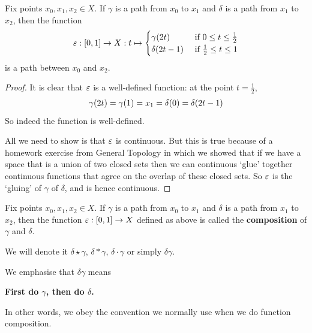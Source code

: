 \begin{proposition}
    Fix points $x_0, x_1, x_2 \in X$. If $\gamma$ is a path from $x_0$ to $x_1$ and $\delta$ is a path from $x_1$ to $x_2$, then the function
    \begin{align*}
        \varepsilon : [0, 1] \to X : t \mapsto
        \begin{cases}
            \gamma\!\left( 2t \right) & \text{ if } 0 \leq t \leq \frac{1}{2} \\
            \delta\!\left( 2t - 1 \right) & \text{ if } \frac{1}{2} \leq t \leq 1
        \end{cases}
    \end{align*}
    is a path between $x_0$ and $x_2$.
\end{proposition}
\begin{proof}
    It is clear that $\varepsilon$ is a well-defined function: at the point $t = \frac{1}{2}$,
    \begin{align*}
        \gamma\!\left( 2t \right) = \gamma\!\left( 1 \right) = x_1 = \delta\!\left( 0 \right) = \delta\!\left( 2t - 1 \right)
    \end{align*}
    So indeed the function is well-defined.

    All we need to show is that $\varepsilon$ is continuous. But this is true because of a homework exercise from General Topology in which we showed that if we have a space that is a union of two closed sets then we can continuous `glue' together continuous functions that agree on the overlap of these closed sets. So $\varepsilon$ is the `gluing' of $\gamma$ of $\delta$, and is hence continuous.
\end{proof}

\begin{boxdefinition}
    Fix points $x_0, x_1, x_2 \in X$. If $\gamma$ is a path from $x_0$ to $x_1$ and $\delta$ is a path from $x_1$ to $x_2$, then the function $\varepsilon : [0, 1] \to X$ defined as above is called the \textbf{composition} of $\gamma$ and $\delta$.
    
    We will denote it $\delta \star \gamma$, $\delta * \gamma$, $\delta \cdot \gamma$ or simply $\delta \gamma$.
\end{boxdefinition}

\begin{boxwarning}
    We emphasise that $\delta \gamma$ means
    \begin{center}
        \textbf{First do $\gamma$, then do $\delta$.}
    \end{center}
    In other words, we obey the convention we normally use when we do function composition.
\end{boxwarning}

